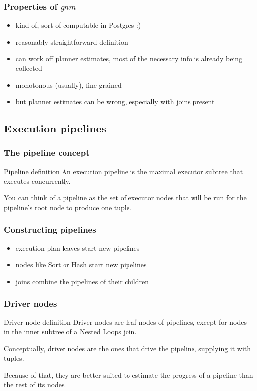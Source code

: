 \documentclass{beamer}
\begin{document}
\begin{frame}
  \frametitle{Properties of $gnm$}

  \begin{itemize}
  \item kind of, sort of computable in Postgres :)
  \item reasonably straightforward definition
  \item can work off planner estimates, most of the necessary info is already
    being collected
  \item monotonous (usually), fine-grained
  \item but planner estimates can be wrong, especially with joins present
  \end{itemize}
\end{frame}

\subsection{Execution pipelines}

\begin{frame}
  \frametitle{The pipeline concept}

  \begin{block}{Pipeline definition}
    An execution pipeline is the maximal executor subtree that executes
    concurrently.
  \end{block}

  \bigskip

  You can think of a pipeline as the set of executor nodes that will be run
  for the pipeline's root node to produce one tuple.
\end{frame}

\begin{frame}
  \frametitle{Constructing pipelines}

  \begin{itemize}
  \item execution plan leaves start new pipelines
  \item nodes like Sort or Hash start new pipelines
  \item joins combine the pipelines of their children
  \end{itemize}
\end{frame}

\begin{frame}
  \frametitle{Driver nodes}

  \begin{block}{Driver node definition}
    Driver nodes are leaf nodes of pipelines, except for nodes in the inner
    subtree of a Nested Loops join.
  \end{block}

  \bigskip

  Conceptually, driver nodes are the ones that \alert{drive} the pipeline,
  supplying it with tuples.

  \bigskip

  Because of that, they are better suited to estimate the progress of a
  pipeline than the rest of its nodes.
\end{frame}
\end{document}
